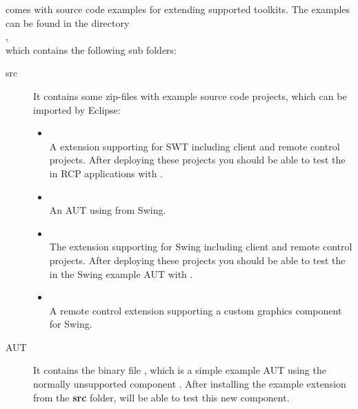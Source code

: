 \app{} comes with source code examples for extending supported toolkits. The
examples can be found in the directory\\
,\\
which contains the following sub folders:

\begin{description}
 \item[src] It contains some zip-files with example source code projects, which
            can be imported by Eclipse:
 \begin{itemize}
   \item {}\\
         A \app{} extension supporting  for SWT including client
         and remote control projects. After deploying these projects you should
         be able to test the  in RCP applications with \app{}.
   \item {}\\
         An AUT using  from Swing.
   \item {}\\
         The \app{} extension supporting  for Swing including
         client and remote control projects. After deploying these projects you
         should be able to test the  in the Swing example AUT
         with \app{}.
   \item {}\\
         A remote control extension supporting a custom graphics
         component for Swing.
 \end{itemize}
 \item[AUT] It contains the binary file , which is a simple
 example AUT using the normally unsupported component . After
 installing the  example extension from the \textbf{src}
 folder, \app{} will be able to test this new component.
\end{description}
